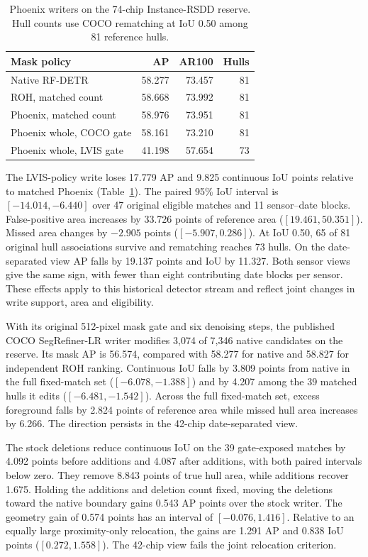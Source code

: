 \documentclass[journal]{IEEEtran}
\begin{document}
\begin{table}[t]
\centering
\caption{Phoenix writers on the 74-chip Instance-RSDD reserve. Hull counts use COCO rematching at IoU 0.50 among 81 reference hulls.}
\label{tab:phoenix-whole}
\footnotesize
\begin{tabular}{@{}lrrr@{}}
\toprule
Mask policy & AP & AR100 & Hulls\\
\midrule
Native RF-DETR & 58.277 & 73.457 & 81\\
ROH, matched count & 58.668 & 73.992 & 81\\
Phoenix, matched count & 58.976 & 73.951 & 81\\
Phoenix whole, COCO gate & 58.161 & 73.210 & 81\\
Phoenix whole, LVIS gate & 41.198 & 57.654 & 73\\
\bottomrule
\end{tabular}
\end{table}

The LVIS-policy write loses 17.779 AP and 9.825 continuous IoU points relative to matched Phoenix (Table~\ref{tab:phoenix-whole}). The paired 95\% IoU interval is \([-14.014,-6.440]\) over 47 original eligible matches and 11 sensor--date blocks. False-positive area increases by 33.726 points of reference area (\([19.461,50.351]\)). Missed area changes by \(-2.905\) points (\([-5.907,0.286]\)). At IoU 0.50, 65 of 81 original hull associations survive and rematching reaches 73 hulls. On the date-separated view AP falls by 19.137 points and IoU by 11.327. Both sensor views give the same sign, with fewer than eight contributing date blocks per sensor. These effects apply to this historical detector stream and reflect joint changes in write support, area and eligibility.

With its original 512-pixel mask gate and six denoising steps, the published COCO SegRefiner-LR writer modifies 3,074 of 7,346 native candidates on the reserve. Its mask AP is 56.574, compared with 58.277 for native and 58.827 for independent ROH ranking. Continuous IoU falls by 3.809 points from native in the full fixed-match set (\([-6.078,-1.388]\)) and by 4.207 among the 39 matched hulls it edits (\([-6.481,-1.542]\)). Across the full fixed-match set, excess foreground falls by 2.824 points of reference area while missed hull area increases by 6.266. The direction persists in the 42-chip date-separated view.

The stock deletions reduce continuous IoU on the 39 gate-exposed matches by 4.092 points before additions and 4.087 after additions, with both paired intervals below zero. They remove 8.843 points of true hull area, while additions recover 1.675. Holding the additions and deletion count fixed, moving the deletions toward the native boundary gains 0.543 AP points over the stock writer. The geometry gain of 0.574 points has an interval of \([-0.076,1.416]\). Relative to an equally large proximity-only relocation, the gains are 1.291 AP and 0.838 IoU points (\([0.272,1.558]\)). The 42-chip view fails the joint relocation criterion.
\end{document}
